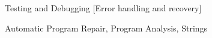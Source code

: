 \documentclass{sig-alternate}
\begin{document}
{Testing and Debugging }
[Error handling and recovery]



\keywords
{
Automatic Program Repair, 
Program Analysis,
Strings}












\small
%


\end{document}
